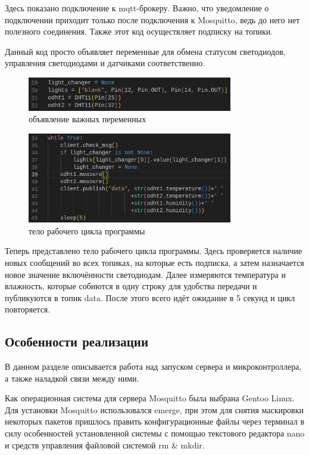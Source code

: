 Здесь показано подключение к mqtt-брокеру. Важно, что уведомление о подключении приходит только после подключения к Mosquitto, ведь до него нет полезного соединения. Также этот код осуществляет подписку на топики.

Данный код просто объявляет переменные для обмена статусом светодиодов, управления светодиодами и датчиками соответственно.

\begin{figure}[h!]
	\centering
	\includegraphics[width=0.8\textwidth]{./graphics/img/image12.png}
	\caption{объявление важных переменных}
	\label{fig:img12}
\end{figure}

\begin{figure}[h!]
	\centering
	\includegraphics[width=0.8\textwidth]{./graphics/img/image34.png}
	\caption{тело рабочего цикла программы}
	\label{fig:img34}
\end{figure}

Теперь представлено тело рабочего цикла программы. Здесь проверяется наличие новых сообщений во всех топиках, на которые есть подписка, а затем назначается новое значение включённости светодиодам. Далее измеряются температура и влажность, которые собиются в одну строку для удобства передачи и публикуются в топик data. После этого всего идёт ожидание в 5 секунд и цикл повторяется.

\subsection{Особенности реализации}

В данном разделе описывается работа над запуском сервера и микроконтроллера, а также наладкой связи между ними.

Как операционная система для сервера Mosquitto была выбрана Gentoo Linux. Для установки Mosquitto использовался emerge, при этом для снятия маскировки некоторых пакетов пришлось править конфигурационные файлы через терминал в силу особенностей установленной системы с помощью текстового редактора nano и средств управления файловой системой rm \& mkdir.

